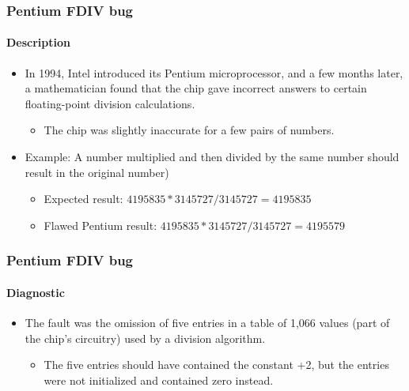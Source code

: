 \begin{frame}[hasprev=false, hasnext=true]
\label{example:pentium-fdiv-bug}
\frametitle{Pentium FDIV bug}
\framesubtitle{Description}

\begin{itemize}
	\item In 1994, Intel introduced its Pentium microprocessor, and a
	few months later, a mathematician found that the chip gave incorrect
	answers to certain floating-point division calculations.
	\begin{itemize}
		\item The chip was slightly inaccurate for a few pairs of numbers.
	\end{itemize}

	\item Example: A number multiplied and then divided by the same number
	should result in the original number)
	\begin{itemize}
		\item Expected result: $4195835*3145727/3145727  = 4195835$
		\item Flawed Pentium result: $4195835*3145727/3145727  = 4195579$
	\end{itemize}
\end{itemize}
\end{frame}


\begin{frame}[hasprev=true, hasnext=true]
\frametitle{Pentium FDIV bug}
\framesubtitle{Diagnostic}

\begin{itemize}
	\item The fault was the omission of five entries in a table of 1,066 values
	(part of the chip's circuitry) used by a division algorithm.
	\begin{itemize}
		\item The five entries should have contained the constant +2, but the
		entries were not initialized and contained zero instead.
	\end{itemize}
\end{itemize}
\end{frame}


